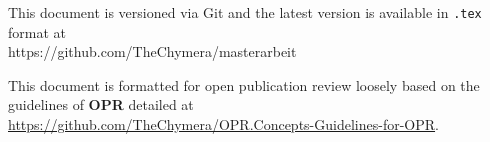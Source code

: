 \footnotesize


\clearpage{}
\null
\vfill
\begin{center}
    \footnotesize\textcolor{mg}{This document is versioned via Git and the latest version is available in \colorbox{vlg}{\texttt{.tex}} format at\\ https://github.com/TheChymera/masterarbeit}
    
    \footnotesize\textcolor{mg}{This document is formatted for open publication review loosely based on the guidelines of \textbf{OPR} detailed at\\ \url{https://github.com/TheChymera/OPR.Concepts-Guidelines-for-OPR}}.
\end{center}

